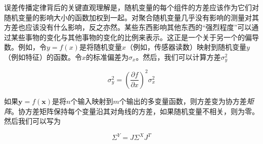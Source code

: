 
误差传播定律背后的关键直观理解是，随机变量的每个组件的方差应该作为它们对随机变量的影响大小的函数加权到一起。对聚合随机变量几乎没有影响的测量对其方差也应该没有什么影响，反之亦然。某些东西影响其他东西的“强烈程度”可以通过某些事物的变化与其他事物的变化的比例来表示。这正是一个关于另一个的偏导数。例如，令$y=f(x)$是将随机变量$x$（例如，传感器读数）映射到随机变量$y$（例如特征）的函数。令$x$的标准偏差为$\sigma_x$。然后，我们可以计算方差$\sigma_y^2$

\begin{equation}
\sigma_y^2=\left(\frac{\partial f}{\partial x}\right)^2 \sigma_x^2
\end{equation}


如果$\mathbf{y}=f(\mathbf{x})$是将$n$个输入映射到$m$个输出的多变量函数，则方差变为协方差\emph{矩阵}。协方差矩阵保持每个变量沿其对角线的方差，如果随机变量不相关，则为零。然后我们可以写为

\begin{equation}
\Sigma^Y= J \Sigma^X J^T
\end{equation}


